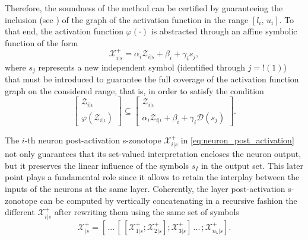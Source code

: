 \documentclass[journal]{IEEEtran}
\begin{document}
Therefore, the soundness of the method can be certified by guaranteeing the inclusion  (see ) of the graph of the activation function in the range $[l_i, \, u_i]$. To that end, 
the activation function $\varphi(\cdot)$ is abstracted  through an affine symbolic function of the form
\begin{equation}\label{eq:neuron_post_activation}
  \mathcal{X}_{i|s}^{+} =   \alpha_i \mathcal{Z}_{i|s} + \beta_i   + \gamma_i s_{j},
\end{equation}
\noindent where  $s_j$ represents a new independent symbol (identified through $j = !(1)$) that must be introduced to guarantee the  full coverage of the activation function graph on the considered range, that is, in order to satisfy the  condition
\begin{equation} \label{eq:inclusion_condition}
  \begin{bmatrix}
       \mathcal{Z}_{i|\iota} \\
    \varphi( \mathcal{Z}_{i|\iota}) 
    \end{bmatrix} \subseteq  \begin{bmatrix}
       \mathcal{Z}_{i|\iota} \\
  \alpha_i \mathcal{Z}_{i|\iota}  + \beta_i   + \gamma_i \mathcal{D}(s_{j})
    \end{bmatrix}.
\end{equation}

The $i$-th neuron post-activation s-zonotope $\mathcal{X}_{i|s}^{+}$ in \eqref{eq:neuron_post_activation} not only guarantees that its set-valued interpretation encloses the neuron output, but it preserves the linear influence of the symbols $s_{I}$ in the output set. This later point plays a fundamental role since it allows to retain the interplay between the inputs of the neurons at the same layer. Coherently, the layer post-activation s-zonotope can be computed by vertically concatenating in a recursive fashion the different  $\mathcal{X}_{i|s}^{+}$ after  rewriting them using the same set of symbols
\begin{equation}
   \mathcal{X}_{|s}^+ = [ \, ... \, [\,[\mathcal{X}_{1|s}^{+};\mathcal{X}_{2|s}^{+}];\mathcal{X}_{3|s}^{+}] \, ... \, ;\mathcal{X}_{n_k|s}^{+}].
\end{equation}
\end{document}
